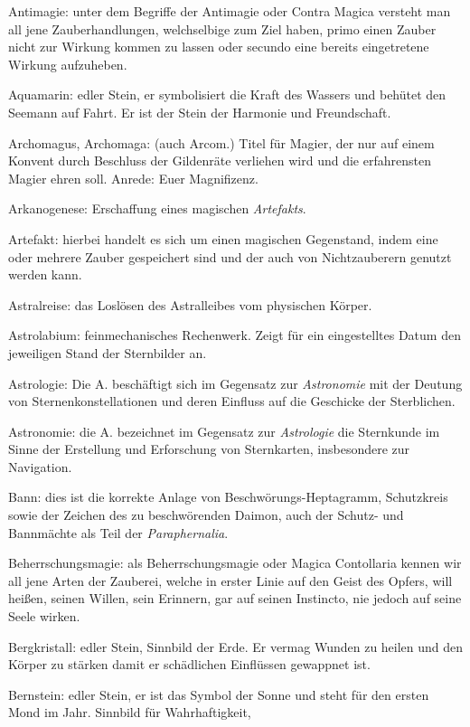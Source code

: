 \documentclass[a5paper,8pt]{book}
\begin{document}
\begin{small}
\begin{description}
 \item Antimagie: unter dem Begriffe der Antimagie oder Contra Magica versteht man all jene Zauberhandlungen, welchselbige zum 
Ziel haben, primo einen Zauber nicht zur Wirkung kommen zu lassen oder secundo eine bereits eingetretene Wirkung 
aufzuheben.
 \item Aquamarin: edler Stein, er symbolisiert die Kraft des Wassers und behütet den Seemann auf Fahrt. Er ist der Stein der Harmonie und Freundschaft.
 \item Archomagus, Archomaga: (auch Arcom.) Titel für Magier, der nur auf einem Konvent durch Beschluss der Gildenräte verliehen wird und die erfahrensten Magier ehren soll. Anrede: Euer Magnifizenz.
 \item Arkanogenese: Erschaffung eines magischen \textit{Artefakts}.
 \item Artefakt: hierbei handelt es sich um einen magischen Gegenstand, indem eine oder mehrere Zauber gespeichert sind und der auch von Nichtzauberern genutzt werden kann.
 \item Astralreise: das Loslösen des Astralleibes vom physischen Körper. 
 \item Astrolabium: feinmechanisches Rechenwerk. Zeigt für ein eingestelltes Datum den jeweiligen Stand der Sternbilder an.
 \item Astrologie: Die A. beschäftigt sich im Gegensatz zur \textit{Astronomie} mit der Deutung von Sternenkonstellationen und 
deren Einfluss auf die Geschicke der Sterblichen.
 \item Astronomie: die A. bezeichnet im Gegensatz zur \textit{Astrologie} die Sternkunde im Sinne der Erstellung und Erforschung 
von Sternkarten, insbesondere zur Navigation.
 \item Bann: dies ist die korrekte Anlage von Beschwörungs-Heptagramm, Schutzkreis sowie der Zeichen des zu beschwörenden Daimon, 
auch der Schutz- und Bannmächte als Teil der \textit{Paraphernalia}.
 \item Beherrschungsmagie: als Beherrschungsmagie oder Magica Contollaria kennen wir all jene Arten der Zauberei, welche in erster 
Linie auf den Geist des Opfers, will heißen, seinen Willen, sein Erinnern, gar auf seinen Instincto, nie jedoch auf seine 
Seele wirken.
 \item Bergkristall: edler Stein, Sinnbild der Erde. Er vermag Wunden zu heilen und den Körper zu stärken damit er schädlichen 
Einflüssen gewappnet ist.
 \item Bernstein: edler Stein, er ist das Symbol der Sonne und steht für den ersten Mond im Jahr. Sinnbild für Wahrhaftigkeit, 

\end{description}
\end{small}
\end{document}
